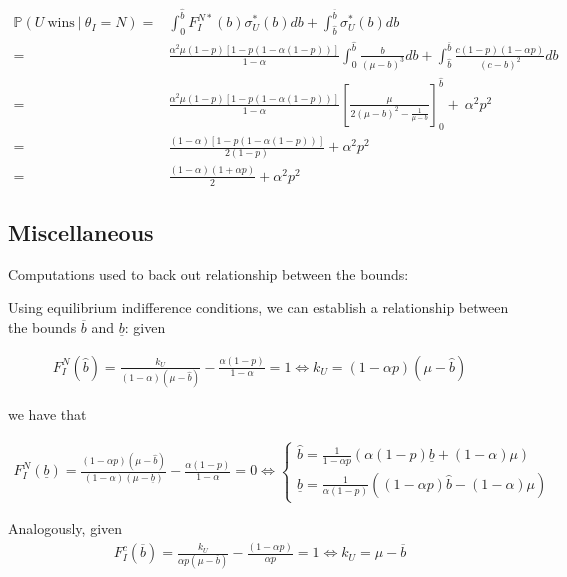 \documentclass[11pt]{article}
\theoremstyle{plain}
\theoremstyle{definition}
\theoremstyle{plain}
\theoremstyle{plain}
\theoremstyle{plain}
\theoremstyle{plain}
\numberwithin{equation}{section}
\begin{document}
\begin{align*}
    \mathbb{P}(U \ \text{wins} \ | \ \theta_I = N) = & \int_{0}^{\hat{b}} F_I^{N*}(b) \sigma_U^*(b) db + \int_{\hat{b}}^{\overline{b}} \sigma_U^*(b) db \\
    = &\frac{\alpha^2 \mu(1-p)\left[1-p\left( 1-\alpha(1-p)\right) \right]}{1-\alpha} \int_{0}^{\hat{b}} \frac{b}{(\mu-b)^3}db + \int_{\hat{b}}^{\overline{b}} \frac{c(1 - p)(1 - \alpha p)}{(c - b)^2}db \\
    = &\frac{\alpha^2 \mu(1-p)\left[1-p\left( 1-\alpha(1-p)\right) \right]}{1-\alpha} \left[ \frac{\mu}{2(\mu-b)^2 - \frac{1}{\mu-b}}\right]_{0}^{\hat{b}} + \ \alpha^2 p^2  \\
    = & \frac{(1-\alpha)\left[1-p\left( 1-\alpha(1-p)\right) \right]}{2(1-p)} + \alpha^2 p^2 \\
    = & \frac{(1-\alpha)(1+\alpha p)}{2} + \alpha^2 p^2 
\end{align*}


\subsection{Miscellaneous}
Computations used to back out relationship between the bounds:

\noindent Using equilibrium indifference conditions, we can establish a relationship between the bounds $\overline{b}$ and $\underline{b}$: given

\begin{align*}
    F_I^N(\hat{b}) =  \frac{k_U}{(1-\alpha)(\mu-\hat{b})} - \frac{\alpha (1-p)}{1-\alpha} = 1 \iff k_U = (1-\alpha p)(\mu-\hat{b})
\end{align*}
\vspace{-0.2mm}

\noindent we have that

\begin{align*}
     F_I^N(\underline{b}) =  \frac{(1-\alpha p)(\mu-\hat{b})}{(1-\alpha)(\mu-\underline{b})} - \frac{\alpha (1-p)}{1-\alpha} = 0 \iff \begin{cases}
         \hat{b} = \frac{1}{1-\alpha p}\left(\alpha(1-p)\underline{b}  + (1-\alpha)\mu \right) \\[5pt]
         \underline{b} = \frac{1}{\alpha (1-p)}\left((1-\alpha p)\hat{b} - (1-\alpha)\mu\right)
     \end{cases}
\end{align*}
\vspace{-0.2mm}

\noindent Analogously, given 
\begin{align*}
    F_I^c(\overline{b}) = \frac{k_U}{\alpha p(\mu-\overline{b})} - \frac{(1-\alpha p)}{\alpha p} = 1 \iff k_U = \mu-\overline{b}
\end{align*}
\vspace{-0.2mm}
\end{document}
